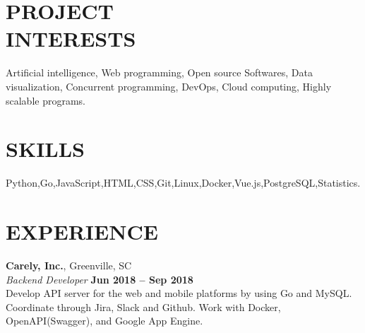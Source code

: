 \documentclass[margin,line]{resume}
\begin{document}
\begin{resume}

\vspace{1mm}

    \section{\mysidestyle \textbf{\large{P}\small{ROJECT\\INTERESTS}}}

    	Artificial intelligence, Web programming, Open source Softwares, Data visualization, Concurrent programming, DevOps, Cloud computing, Highly scalable programs.

\sectionline

    \section{\mysidestyle \textbf{\large{S}\small{KILLS}}}

    Python,\hspace{2mm}Go,\hspace{2mm}JavaScript,\hspace{2mm}HTML,\hspace{2mm}CSS,\hspace{2mm}Git,\hspace{2mm}Linux,\hspace{2mm}Docker,\hspace{2mm}Vue.js,\hspace{2mm}PostgreSQL,\hspace{2mm}Statistics.
    


\sectionline

    \section{\mysidestyle \textbf{\large{E}\small{XPERIENCE}}}

    \textbf{\listing Carely, Inc.}, Greenville, SC \vspace{2mm}\\\vspace{1mm}%
    \textsl{Backend Developer} \hfill \textbf{Jun 2018 -- Sep 2018}\\
    Develop API server for the web and mobile platforms by using Go and MySQL. Coordinate through Jira, Slack and Github. Work with Docker, OpenAPI(Swagger), and Google App Engine.\vspace{1mm}
    

\end{resume}
\end{document}
